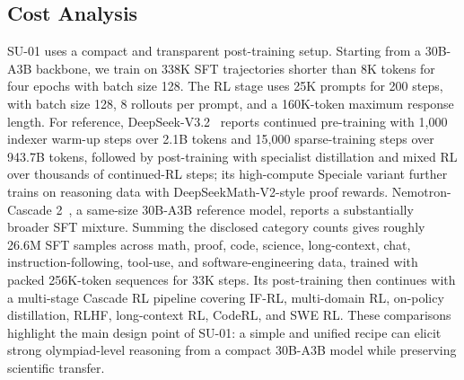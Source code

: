 \subsection{Cost Analysis}
\label{sec:cost_analysis}





SU-01 uses a compact and transparent post-training setup. Starting from a
30B-A3B backbone, we train on 338K SFT trajectories shorter than 8K tokens for
four epochs with batch size 128. The RL stage uses 25K prompts for 200 steps,
with batch size 128, 8 rollouts per prompt, and a 160K-token maximum response
length. 
For reference, DeepSeek-V3.2~\citep{deepseekai2025deepseekv32} reports
continued pre-training with 1,000 indexer warm-up steps over 2.1B tokens and
15,000 sparse-training steps over 943.7B tokens, followed by post-training with
specialist distillation and mixed RL over thousands of continued-RL steps; its
high-compute Speciale variant further trains on reasoning data with DeepSeekMath-V2-style proof rewards. 
Nemotron-Cascade 2~\citep{yang2026nemotroncascade2}, a same-size 30B-A3B
reference model, reports a substantially broader SFT mixture. Summing the
disclosed category counts gives roughly 26.6M SFT samples across math, proof,
code, science, long-context, chat, instruction-following, tool-use, and
software-engineering data, trained with packed 256K-token sequences for 33K
steps. Its post-training then continues with a multi-stage Cascade RL pipeline
covering IF-RL, multi-domain RL, on-policy distillation, RLHF, long-context RL,
CodeRL, and SWE RL. 
These comparisons highlight the main design point of SU-01:
a simple and unified recipe can elicit strong olympiad-level reasoning from a
compact 30B-A3B model while preserving scientific transfer.